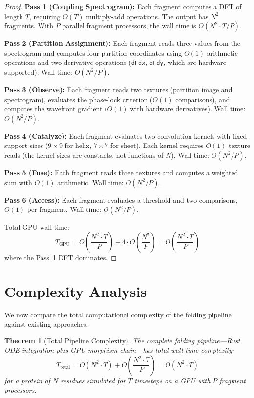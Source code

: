 \documentclass[11pt,twocolumn,a4paper]{article}
\newtheorem{theorem}{Theorem}[section]
\theoremstyle{definition}
\theoremstyle{remark}
\begin{document}
\begin{proof}
\textbf{Pass 1 (Coupling Spectrogram):} Each fragment computes a DFT of length $T$, requiring $O(T)$ multiply-add operations. The output has $N^2$ fragments. With $P$ parallel fragment processors, the wall time is $O(N^2 \cdot T / P)$.

\textbf{Pass 2 (Partition Assignment):} Each fragment reads three values from the spectrogram and computes four partition coordinates using $O(1)$ arithmetic operations and two derivative operations (\texttt{dFdx}, \texttt{dFdy}, which are hardware-supported). Wall time: $O(N^2 / P)$.

\textbf{Pass 3 (Observe):} Each fragment reads two textures (partition image and spectrogram), evaluates the phase-lock criterion ($O(1)$ comparisons), and computes the wavefront gradient ($O(1)$ with hardware derivatives). Wall time: $O(N^2 / P)$.

\textbf{Pass 4 (Catalyze):} Each fragment evaluates two convolution kernels with fixed support sizes ($9 \times 9$ for helix, $7 \times 7$ for sheet). Each kernel requires $O(1)$ texture reads (the kernel sizes are constants, not functions of $N$). Wall time: $O(N^2 / P)$.

\textbf{Pass 5 (Fuse):} Each fragment reads three textures and computes a weighted sum with $O(1)$ arithmetic. Wall time: $O(N^2 / P)$.

\textbf{Pass 6 (Access):} Each fragment evaluates a threshold and two comparisons, $O(1)$ per fragment. Wall time: $O(N^2 / P)$.

Total GPU wall time:
\begin{equation}
T_{\text{GPU}} = O\!\left(\frac{N^2 \cdot T}{P}\right) + 4 \cdot O\!\left(\frac{N^2}{P}\right) = O\!\left(\frac{N^2 \cdot T}{P}\right)
\end{equation}
where the Pass~1 DFT dominates.
\end{proof}

\section{Complexity Analysis}
\label{sec:complexity}

We now compare the total computational complexity of the folding pipeline against existing approaches.

\begin{theorem}[Total Pipeline Complexity]
\label{thm:total_complexity}
The complete folding pipeline---Rust ODE integration plus GPU morphism chain---has total wall-time complexity:
\begin{equation}
T_{\text{total}} = O(N^2 \cdot T) + O\!\left(\frac{N^2 \cdot T}{P}\right) = O(N^2 \cdot T)
\end{equation}
for a protein of $N$ residues simulated for $T$ timesteps on a GPU with $P$ fragment processors.
\end{theorem}
\end{document}
